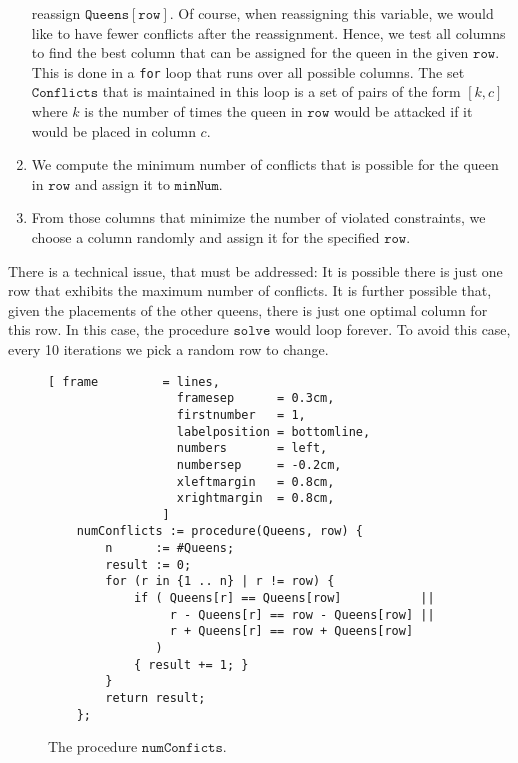 \begin{enumerate}
      reassign $\mathtt{Queens[row]}$.  Of course, when reassigning this variable, we would like to have fewer
      conflicts after the reassignment.  Hence, we test all columns to find the best column that can be
      assigned for the queen in the given $\mathtt{row}$.  This is done in a \texttt{for} loop that runs over
      all possible columns.  The set $\mathtt{Conflicts}$ that is maintained in this loop is a set of pairs
      of the form $[k, c]$ where $k$ is the number of times the queen in $\mathtt{row}$ would be attacked if it
      would be placed in column $c$.
\item We compute the minimum number of conflicts that is possible for the queen in $\mathtt{row}$ and assign it
      to $\mathtt{minNum}$.
\item From those columns that minimize the number of violated constraints, we choose a column randomly
      and assign it for the specified $\mathtt{row}$.
\end{enumerate}
There is a technical issue, that must be addressed:  It is possible there is just one row that exhibits the
maximum number of conflicts.  It is further possible that, given the placements of the other queens, there is
just one optimal column for this row.  In this case, the procedure $\mathtt{solve}$ would loop forever.  To
avoid this case, every 10 iterations we pick a random row to change.

\begin{figure}[!ht]
\centering
\begin{Verbatim}[ frame         = lines, 
                  framesep      = 0.3cm, 
                  firstnumber   = 1,
                  labelposition = bottomline,
                  numbers       = left,
                  numbersep     = -0.2cm,
                  xleftmargin   = 0.8cm,
                  xrightmargin  = 0.8cm,
                ]
    numConflicts := procedure(Queens, row) {
        n      := #Queens;
        result := 0;
        for (r in {1 .. n} | r != row) {
            if ( Queens[r] == Queens[row]           ||
                 r - Queens[r] == row - Queens[row] ||
                 r + Queens[r] == row + Queens[row]
               )
            { result += 1; }
        }
        return result;
    };
\end{Verbatim}
\vspace*{-0.3cm}
\caption{The procedure $\mathtt{numConficts}$.}
\label{fig:numConficts.stlx}
\end{figure}

